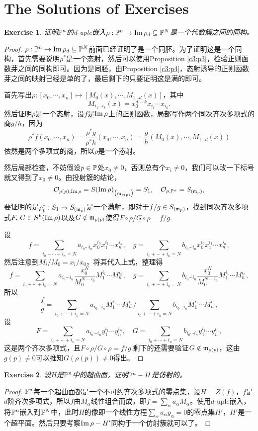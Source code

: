 \documentclass[9pt]{extbook}
\theoremstyle{plain}%
\newtheorem{exe}{Exercise}[section]%
\begin{document}
\section*{The Solutions of Exercises}
\setcounter{exe}{3}
\begin{exe}
	证明$\mathbb{P}^n$的d-uple嵌入$\rho:\mathbb{P}^n\to \operatorname{Im} \rho_d\subseteq \mathbb{P}^N$是一个代数簇之间的同构。
\end{exe}
\begin{proof}
	$\rho:\mathbb{P}^n\to \operatorname{Im} \rho_d\subseteq \mathbb{P}^N$前面已经证明了是一个同胚。为了证明这是一个同构，首先需要说明$\rho^*$是一个态射，然后可以使用Proposition \ref{c3:p3}，检验正则函数芽之间的同构即可。因为是同胚，由Proposition \ref{c3:p4}，态射诱导的正则函数芽之间的映射已经是单的了，最后剩下的只要证明这是满的即可。

	首先写出$\rho:[x_0,\cdots,x_n]\mapsto [M_0(x),\cdots,M_{1\cdots d}(x)]$，其中
	\[
		M_{i_1\cdots i_k}(x)=x_0^{d-k}x_{i_1}\cdots x_{i_k}.
	\]
	然后证明$\rho$是一个态射，设$f$是$\operatorname{Im} \rho$上的正则函数，局部写作两个同次齐次多项式的商$g/h$，因为
	\[
		\rho^*f(x_0,\cdots,x_n)=\frac{\rho^*g}{\rho^*h}(x_0,\cdots,x_n)=\frac{g}{h}(M_0(x),\cdots,M_{1\cdots d}(x))
	\]
	依然是两个多项式的商，所以$\rho$是一个态射。

	然后局部检查，不妨假设$p\in \mathbb{P}$处$x_0\neq 0$，否则总有个$x_i\neq 0$，我们可以改一下标号就又得到了$x_0\neq 0$。由投射簇的结论，
	\[
		\mathcal{O}_{\rho(p),\operatorname{Im}\rho}=S(\operatorname{Im}\rho)_{\bigl(\mathfrak{m}_{\rho(p)}\bigr)}=S_1, \quad \mathcal{O}_{p,\mathbb{P}^n}=S_{(\mathfrak{m}_{p})},
	\]
	要证明的是$\rho^*_p:S_1\to S_{(\mathfrak{m}_{p})}$是一个满射，即对于$f/g\in S_{(\mathfrak{m}_{p})}$，找到同次齐次多项式$F,\,G\in S^{\mathrm{h}}(\operatorname{Im}\rho)$以及$G\notin \mathfrak{m}_{\rho(p)}$使得$F\circ \rho/G\circ \rho=f/g$.

	设
	\[
		f=\sum_{i_0+\cdots +i_n=N} a_{i_0\cdots i_n} x_0^{i_0}x_1^{i_1}\cdots x_n^{i_n},\quad g=\sum_{i_0+\cdots +i_n=N} b_{i_0\cdots i_n} x_0^{i_0}x_1^{i_1}\cdots x_n^{i_n},
	\]
	然后注意到$M_i/M_0=x_i/x_0$，将其代入上式，整理得
	\[
		f=\sum_{i_0+\cdots +i_n=N} a_{i_0\cdots i_n} \frac{x_0^N}{M_0^{N-i_0}}M_1^{i_1}\cdots M_n^{i_n},\quad g=\sum_{i_0+\cdots +i_n=N} b_{i_0\cdots i_n} \frac{x_0^N}{M_0^{N-i_0}}M_1^{i_1}\cdots M_n^{i_n},
	\]
	所以
	\[
		\frac{f}{g}=\sum_{i_0+\cdots +i_n=N} a_{i_0\cdots i_n} M_1^{i_1}\cdots M_n^{i_n}\Bigg/\sum_{i_0+\cdots +i_n=N} b_{i_0\cdots i_n} M_1^{i_1}\cdots M_n^{i_n},
	\]
	设
	\[
		F=\sum_{i_0+\cdots +i_n=N} a_{i_0\cdots i_n} y_1^{i_1}\cdots y_n^{i_n},\quad G=\sum_{i_0+\cdots +i_n=N} b_{i_0\cdots i_n} y_1^{i_1}\cdots y_n^{i_n},
	\]
	这是两个齐次多项式，且$F\circ \rho/G\circ \rho=f/g$.剩下的还需要验证$G\notin \mathfrak{m}_{\rho(p)}$，这由$g(p)\neq 0$可以推知$G(\rho(p))\neq 0$得出。
\end{proof}
\begin{exe}
	设$H$是$\mathbb{P}^n$中的超曲面，证明$\mathbb{P}^n-H$是仿射的。
\end{exe}
\begin{proof}
	$\mathbb{P}^n$每一个超曲面都是一个不可约齐次多项式的零点集，设$H=Z(f)$，$f$是$d$阶齐次多项式，所以$f$由$M_\alpha$线性组合而成，即$f=\sum_\alpha a_\alpha M_\alpha$。使用$d$-uple嵌入，将$\mathbb{P}^n$嵌入到$\mathbb{P}^N$中，此时$H$的像即一个线性方程$\sum_\alpha a_\alpha y_\alpha=0$的零点集$H'$，$H'$是一个超平面。然后只要考察$\operatorname{Im} \rho-H'$同构于一个仿射簇就可以了。
\end{proof}
\end{document}
